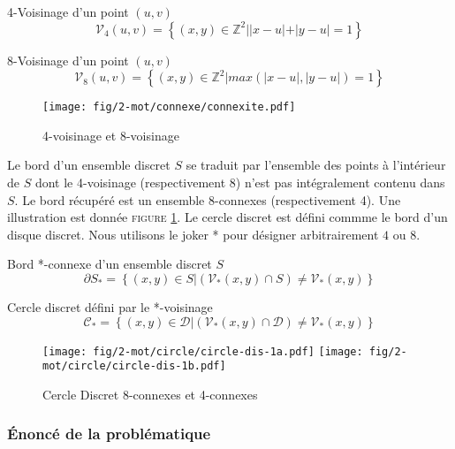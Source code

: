 \begin{Definition}{4-Voisinage d'un point $(u,v)$}
\label{def:vois-4}
  $$\mathcal{V}_4(u,v) =  \left\{ (x,y) \in \mathbb{Z}^{2} |  |x-u|+|y-u| = 1 \right\}$$
\end{Definition}

\begin{Definition}{8-Voisinage d'un point $(u,v)$}
\label{def:vois-8}
  $$\mathcal{V}_8(u,v) =  \left\{ (x,y) \in \mathbb{Z}^{2} |  max(|x-u|,|y-u|) = 1 \right\}$$
\end{Definition}

\begin{figure}[H]
  \centering
  \texttt{[image: fig/2-mot/connexe/connexite.pdf]}
  \caption{4-voisinage et 8-voisinage}
\end{figure}

Le bord d'un ensemble discret $S$ se traduit par l'ensemble des points à l'intérieur de $S$ dont le 4-voisinage (respectivement 8) n'est pas intégralement contenu dans $S$. Le bord récupéré est un ensemble 8-connexes (respectivement 4). Une illustration est donnée \textsc{figure} \ref{fig:bord}. Le cercle discret est défini commme le bord d'un disque discret. Nous utilisons le joker * pour désigner arbitrairement $4$ ou $8$. 

\begin{Definition}{Bord *-connexe d'un ensemble discret $S$}
\label{def:bord-ens}
  $$ \partial S_{*} =  \left\{ (x,y) \in S | \left( \mathcal{V}_{*}(x,y) \cap S \right) \neq \mathcal{V}_{*}(x,y) \right\}$$
\end{Definition}

\begin{Definition}{Cercle discret défini par le *-voisinage}
\label{def:cer-dis}
  $$ \mathcal{C}_{*} =  \left\{ (x,y) \in \mathcal{D} | \left( \mathcal{V}_{*}(x,y) \cap \mathcal{D} \right) \neq \mathcal{V}_{*}(x,y) \right\}$$
\end{Definition}

\begin{figure}[H]
  \centering
  \texttt{[image: fig/2-mot/circle/circle-dis-1a.pdf]}
  \texttt{[image: fig/2-mot/circle/circle-dis-1b.pdf]}
  \caption{Cercle Discret 8-connexes et 4-connexes}
\label{fig:bord}
\end{figure}


\subsubsection{Énoncé de la problématique}

